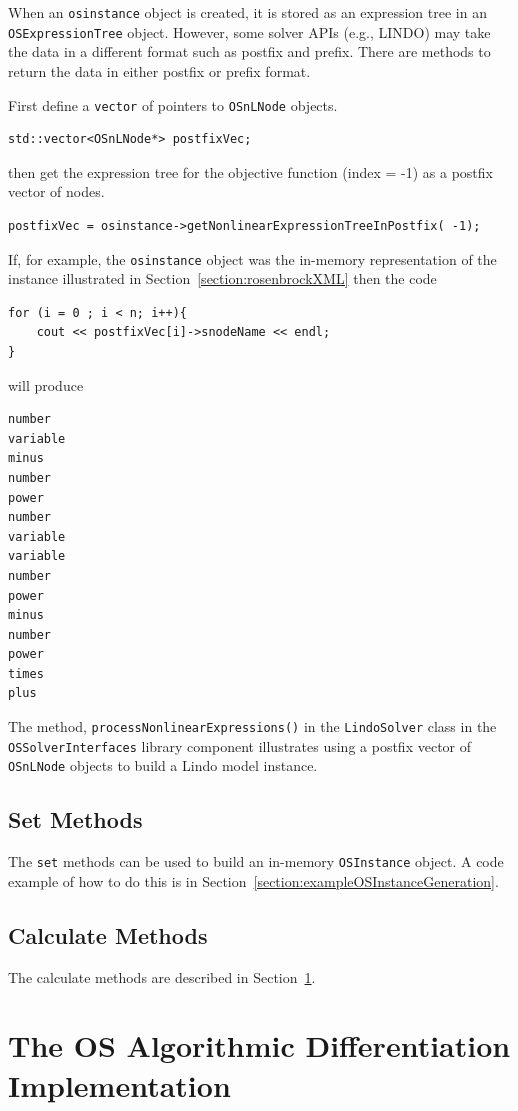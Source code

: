 \documentclass[11pt]{article}
\renewcommand{\_}{{\char"5F}}
\renewcommand{\{}{{\char"7B}}
\renewcommand{\}}{{\char"7D}}
\renewcommand{\^}{{\char"0D}}
\renewcommand{\'}{{\char"0D}}
\begin{document}
\begin{enumerate}[Step 1:]
When an {\tt osinstance} object is created, it is stored as an expression tree in an {\tt OSExpressionTree} object. However, some solver APIs (e.g., LINDO) may take the data in a different format such as postfix and prefix. There are methods to return the data in either postfix or prefix format.

First define a {\tt vector} of pointers to {\tt OSnLNode} objects.
\begin{verbatim}
std::vector<OSnLNode*> postfixVec;
\end{verbatim}
then get the expression tree for the objective function (index = -1) as a postfix vector of nodes.
\begin{verbatim}
postfixVec = osinstance->getNonlinearExpressionTreeInPostfix( -1);
\end{verbatim}
If, for example, the {\tt osinstance} object was the in-memory representation of   the instance illustrated in  Section~\ref{section:rosenbrockXML} then the code
\begin{verbatim}
for (i = 0 ; i < n; i++){
    cout << postfixVec[i]->snodeName << endl;
}
\end{verbatim}
will produce
\begin{verbatim}
number
variable
minus
number
power
number
variable
variable
number
power
minus
number
power
times
plus
\end{verbatim}
The method, {\tt processNonlinearExpressions()} in the {\tt LindoSolver} class in the {\tt OSSolverInterfaces} library component illustrates using a postfix vector of {\tt OSnLNode} objects to build a Lindo model instance.


\subsection{Set Methods}

The {\tt set} methods can be used to build an in-memory {\tt OSInstance}
 object. A code example of how to do this is in Section~\ref{section:exampleOSInstanceGeneration}.

\subsection{Calculate Methods}

The calculate methods are described in Section~\ref{section:ad}.

\section{The OS Algorithmic Differentiation Implementation}\label{section:ad}


\end{enumerate}
\end{document}
